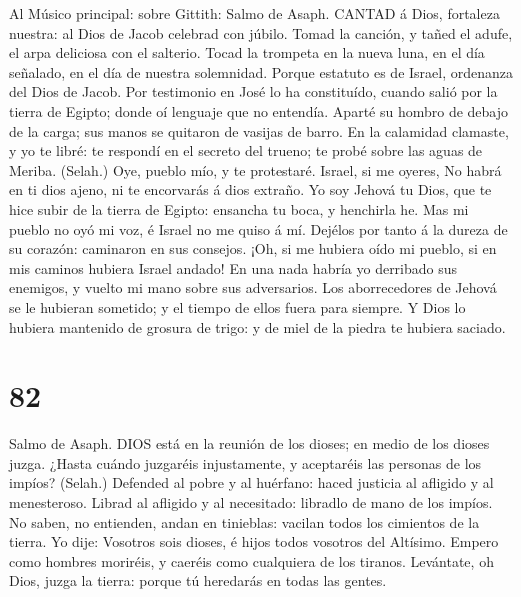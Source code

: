  Al Músico principal: sobre Gittith: Salmo de Asaph. CANTAD
á Dios, fortaleza nuestra: al Dios de Jacob celebrad con júbilo.
 Tomad la canción, y tañed el adufe, el arpa deliciosa con
el salterio.  Tocad la trompeta en la nueva luna, en el día
señalado, en el día de nuestra solemnidad.  Porque estatuto
es de Israel, ordenanza del Dios de Jacob.  Por testimonio
en José lo ha constituído, cuando salió por la tierra de Egipto; donde
oí lenguaje que no entendía.  Aparté su hombro de debajo de
la carga; sus manos se quitaron de vasijas de barro.  En la
calamidad clamaste, y yo te libré: te respondí en el secreto del trueno;
te probé sobre las aguas de Meriba. (Selah.)  Oye, pueblo
mío, y te protestaré. Israel, si me oyeres,  No habrá en ti
dios ajeno, ni te encorvarás á dios extraño.  Yo soy Jehová
tu Dios, que te hice subir de la tierra de Egipto: ensancha tu boca, y
henchirla he.  Mas mi pueblo no oyó mi voz, é Israel no me
quiso á mí.  Dejélos por tanto á la dureza de su corazón:
caminaron en sus consejos.  ¡Oh, si me hubiera oído mi
pueblo, si en mis caminos hubiera Israel andado!  En una
nada habría yo derribado sus enemigos, y vuelto mi mano sobre sus
adversarios.  Los aborrecedores de Jehová se le hubieran
sometido; y el tiempo de ellos fuera para siempre.  Y Dios
lo hubiera mantenido de grosura de trigo: y de miel de la piedra te
hubiera saciado.

\hypertarget{section-81}{%
\section{82}\label{section-81}}

 Salmo de Asaph. DIOS está en la reunión de los dioses; en
medio de los dioses juzga.  ¿Hasta cuándo juzgaréis
injustamente, y aceptaréis las personas de los impíos? (Selah.)
 Defended al pobre y al huérfano: haced justicia al afligido
y al menesteroso.  Librad al afligido y al necesitado:
libradlo de mano de los impíos.  No saben, no entienden,
andan en tinieblas: vacilan todos los cimientos de la tierra.
 Yo dije: Vosotros sois dioses, é hijos todos vosotros del
Altísimo.  Empero como hombres moriréis, y caeréis como
cualquiera de los tiranos.  Levántate, oh Dios, juzga la
tierra: porque tú heredarás en todas las gentes.

